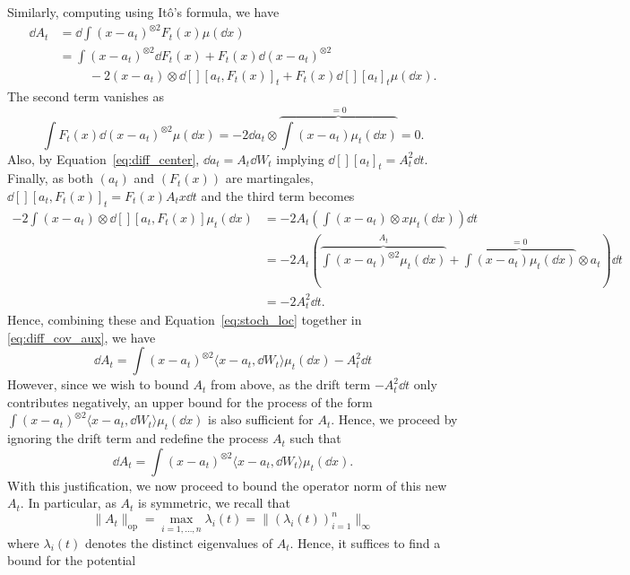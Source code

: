 Similarly, computing using Itô's formula, we have
\begin{equation}\label{eq:diff_cov_aux}
  \begin{split}
    \dd A_t & = \dd \int (x - a_t)^{\otimes 2} F_t(x) \mu(\dd x)\\
      & = \int (x - a_t)^{\otimes 2} \dd F_t(x) + F_t(x) \dd (x - a_t)^{\otimes 2}\\
      & \hspace{1cm} - 2 (x - a_t) \otimes \dd[][a_t, F_t(x)]_t +F_t(x)\dd[][a_t]_t\mu(\dd x).
  \end{split}
\end{equation}
The second term vanishes as 
\[\int F_t(x) \dd (x - a_t)^{\otimes 2} \mu(\dd x) = -2 \dd a_t \otimes 
  \overbrace{\int (x - a_t) \mu_t(\dd x)}^{= 0} = 0.\]
Also, by Equation~\eqref{eq:diff_center}, \(\dd a_t = A_t \dd W_t\) implying \(\dd[][a_t]_t = A_t^2 \dd t\).
Finally, as both \((a_t)\) and \((F_t(x))\) are martingales, \(\dd[] [a_t, F_t(x)]_t = F_t(x) A_t x \dd t\) 
and the third term becomes
\begin{align*}
  -2 \int (x - a_t) \otimes \dd[] [a_t, F_t(x)] \mu_t(\dd x) 
  & = - 2A_t \left(\int (x - a_t) \otimes x \mu_t(\dd x)\right) \dd t \\
  & = -2 A_t \left(\overbrace{\int (x - a_t)^{\otimes 2} \mu_t(\dd x)}^{A_t} + 
    \overbrace{\int (x - a_t) \mu_t(\dd x)}^{= 0} \otimes a_t \right) \dd t\\ 
  & = -2 A_t^2 \dd t.
\end{align*}
Hence, combining these and Equation~\eqref{eq:stoch_loc} together in \eqref{eq:diff_cov_aux}, we have
\[\dd A_t = \int (x - a_t)^{\otimes 2} \langle x - a_t, \dd W_t \rangle \mu_t(\dd x) - A_t^2 \dd t\]
However, since we wish to bound \(A_t\) from above, as the drift term \(- A_t^2 \dd t\) only contributes 
negatively, an upper bound for the process of the form 
\(\int (x - a_t)^{\otimes 2} \langle x - a_t, \dd W_t \rangle \mu_t(\dd x)\) is also sufficient for \(A_t\).
Hence, we proceed by ignoring the drift term and redefine the process \(A_t\) such that
\begin{equation}\label{eq:diff_cov}
  \dd A_t = \int (x - a_t)^{\otimes 2} \langle x - a_t, \dd W_t \rangle \mu_t(\dd x).
\end{equation}
With this justification, we now proceed to bound the operator norm of this new \(A_t\). In particular, 
as \(A_t\) is symmetric, we recall that 
\[\|A_t\|_{\text{op}} = \max_{i= 1, \ldots, n} \lambda_i(t) = \|(\lambda_i(t))_{i = 1}^n\|_\infty\]
where \(\lambda_i(t)\) denotes the distinct eigenvalues of \(A_t\). Hence, it suffices to find a bound for the potential 
